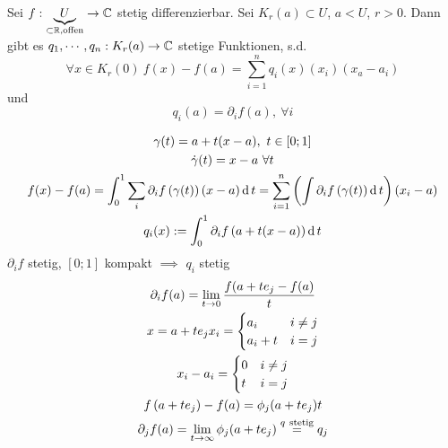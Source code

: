 \begin{Kor}
  Sei $f:\underbrace{U}_{\subset\mathbb{R}, \text{offen}}\to\mathbb{C}$ stetig differenzierbar. Sei $K_r(a)\subset U$, $a<U$, $r>0$. Dann gibt es $q_1,\cdots,q_n:K_r(a)\to\mathbb{C}$ stetige Funktionen, s.d.
  \[\forall x\in K_r(0)\ f(x)-f(a)=\sum^n_{i=1}q_i(x)(x_i)(x_a-a_i)\]
  und
  \[q_i(a)=\partial_if(a),\ \forall i\]
\end{Kor}
\begin{Bew}
  \begin{gather*}
    \gamma(t)=a+t(x-a),\ t\in[0;1]\\
    \dot\gamma(t)=x-a\ \forall t\\
    f(x)-f(a)=\int^1_0\sum_i\partial_if\left( \gamma(t) \right)(x-a)\operatorname{d} t =\sum^n_{i=1}\left( \int\partial_if\left( \gamma(t) \right)\operatorname{d} t \right)(x_i-a)\\
    q_i(x):=\int^1_0\partial_if\left( a+t(x-a) \right)\operatorname{d} t
  \end{gather*}
  $\partial_if$ stetig, $[0;1]$ kompakt $\implies$ $q_i$ stetig
  \begin{gather*}
    \partial_if(a)=\Limo{t}\frac{f(a+te_j-f(a)}{t}\\
    x=a+te_j
    x_i=\begin{cases}
      a_i&i\neq j\\a_i+t&i=j
    \end{cases}\\
    x_i-a_i =\begin{cases}
      0&i\neq j\\t&i=j
    \end{cases}\\
    f\left( a+te_j \right)-f(a)=\phi_j(a+te_j)t\\
    \partial_jf(a)=\Limi{t}\phi_j(a+te_j)\stackrel{q\ \text{stetig}}{=}q_j
  \end{gather*}
\end{Bew}
